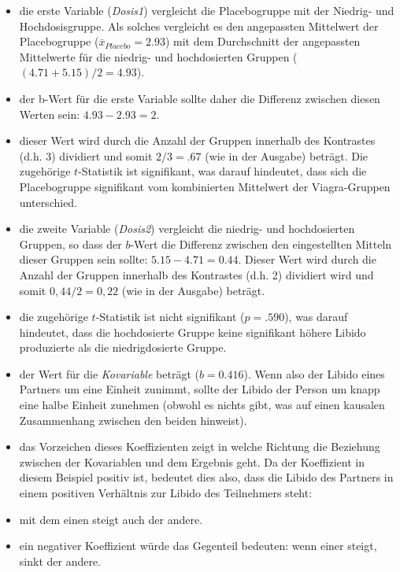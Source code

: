 \documentclass[]{article}
\begin{document}
\begin{itemize}
\item
  die erste Variable (\emph{Dosis1}) vergleicht die Placebogruppe mit
  der Niedrig- und Hochdosisgruppe. Als solches vergleicht es den
  angepassten Mittelwert der Placebogruppe
  (\(\bar{x}_{Placebo} = 2.93\)) mit dem Durchschnitt der angepassten
  Mittelwerte für die niedrig- und hochdosierten Gruppen
  (\((4.71+5.15)/2 = 4.93\)).
\item
  der b-Wert für die erste Variable sollte daher die Differenz zwischen
  diesen Werten sein: \(4.93 - 2.93 = 2\).
\item
  dieser Wert wird durch die Anzahl der Gruppen innerhalb des Kontrastes
  (d.h. 3) dividiert und somit \(2/3 = .67\) (wie in der Ausgabe)
  beträgt. Die zugehörige \(t\)-Statistik ist signifikant, was darauf
  hindeutet, dass sich die Placebogruppe signifikant vom kombinierten
  Mittelwert der Viagra-Gruppen unterschied.
\item
  die zweite Variable (\emph{Dosis2}) vergleicht die niedrig- und
  hochdosierten Gruppen, so dass der \(b\)-Wert die Differenz zwischen
  den eingestellten Mitteln dieser Gruppen sein sollte:
  \(5.15 - 4.71 = 0.44\). Dieser Wert wird durch die Anzahl der Gruppen
  innerhalb des Kontrastes (d.h. 2) dividiert wird und somit
  \(0,44/2 = 0,22\) (wie in der Ausgabe) beträgt.
\item
  die zugehörige \(t\)-Statistik ist nicht signifikant (\(p = .590\)),
  was darauf hindeutet, dass die hochdosierte Gruppe keine signifikant
  höhere Libido produzierte als die niedrigdosierte Gruppe.
\item
  der Wert für die \emph{Kovariable} beträgt (\(b = 0.416\)). Wenn also
  der Libido eines Partners um eine Einheit zunimmt, sollte der Libido
  der Person um knapp eine halbe Einheit zunehmen (obwohl es nichts
  gibt, was auf einen kausalen Zusammenhang zwischen den beiden
  hinweist).
\item
  das Vorzeichen dieses Koeffizienten zeigt in welche Richtung die
  Beziehung zwischen der Kovariablen und dem Ergebnis geht. Da der
  Koeffizient in diesem Beispiel positiv ist, bedeutet dies also, dass
  die Libido des Partners in einem positiven Verhältnis zur Libido des
  Teilnehmers steht:
\item
  mit dem einen steigt auch der andere.
\item
  ein negativer Koeffizient würde das Gegenteil bedeuten: wenn einer
  steigt, sinkt der andere.
\end{itemize}
\end{document}

